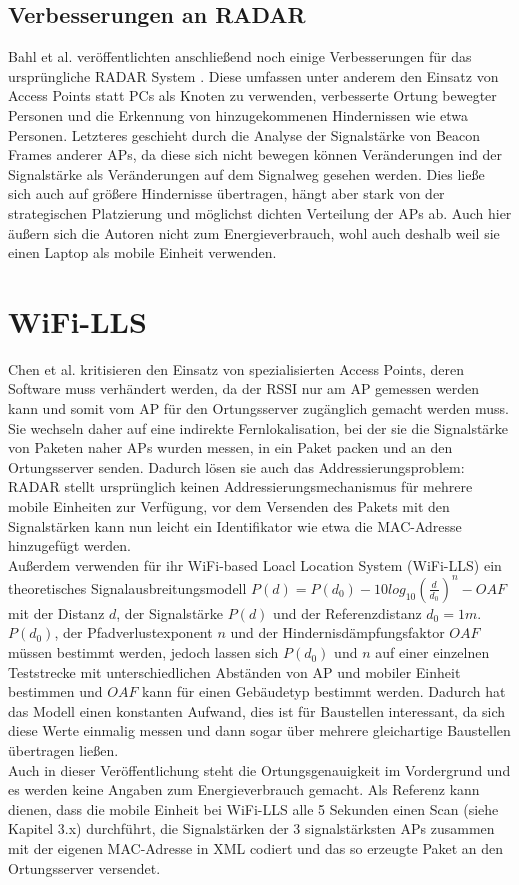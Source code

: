 \subsection{Verbesserungen an RADAR}
Bahl et al. veröffentlichten anschließend noch einige Verbesserungen für das ursprüngliche RADAR System \cite{bahl2000enhancements}.
Diese umfassen unter anderem den Einsatz von Access Points statt PCs als Knoten zu verwenden, verbesserte Ortung bewegter Personen und die Erkennung von hinzugekommenen Hindernissen wie etwa Personen.
Letzteres geschieht durch die Analyse der Signalstärke von Beacon Frames anderer APs, da diese sich nicht bewegen können Veränderungen ind der Signalstärke als Veränderungen auf dem Signalweg gesehen werden.
Dies ließe sich auch auf größere Hindernisse übertragen, hängt aber stark von der strategischen Platzierung und möglichst dichten Verteilung der APs ab.
Auch hier äußern sich die Autoren nicht zum Energieverbrauch, wohl auch deshalb weil sie einen Laptop als mobile Einheit verwenden.


\section{WiFi-LLS}
\label{ch:Vorherige:sec:LLS}
Chen et al. kritisieren den Einsatz von spezialisierten Access Points, deren Software muss verhändert werden, da der RSSI nur am AP gemessen werden kann und somit vom AP für den Ortungsserver zugänglich gemacht werden muss. 
Sie wechseln daher auf eine indirekte Fernlokalisation, bei der sie die Signalstärke von Paketen naher APs wurden messen, in ein Paket packen und an den Ortungsserver senden. 
Dadurch lösen sie auch das Addressierungsproblem: RADAR stellt ursprünglich keinen Addressierungsmechanismus für mehrere mobile Einheiten zur Verfügung, vor dem Versenden des Pakets mit den Signalstärken kann nun leicht ein Identifikator wie etwa die MAC-Adresse hinzugefügt werden.\\
Außerdem verwenden für ihr WiFi-based Loacl Location System (WiFi-LLS) ein theoretisches Signalausbreitungsmodell $P(d) = P(d_0) - 10log_{10}(\frac{d}{d_0})^n - OAF$ mit der Distanz $d$, der Signalstärke $P(d)$ und der Referenzdistanz $d_0 = 1m$. 
$P(d_0)$, der Pfadverlustexponent $n$ und der Hindernisdämpfungsfaktor $OAF$ müssen bestimmt werden, jedoch lassen sich $P(d_0)$ und $n$ auf einer einzelnen Teststrecke mit unterschiedlichen Abständen von AP und mobiler Einheit bestimmen und $OAF$ kann für einen Gebäudetyp bestimmt werden.
Dadurch hat das Modell einen konstanten Aufwand, dies ist für Baustellen interessant, da sich diese Werte einmalig messen und dann sogar über mehrere gleichartige Baustellen übertragen ließen.\\
Auch in dieser Veröffentlichung steht die Ortungsgenauigkeit im Vordergrund und es werden keine Angaben zum Energieverbrauch gemacht. 
Als Referenz kann dienen, dass die mobile Einheit bei WiFi-LLS alle 5 Sekunden einen Scan (siehe Kapitel 3.x) durchführt, die Signalstärken der 3 signalstärksten APs zusammen mit der eigenen MAC-Adresse in XML codiert und das so erzeugte Paket an den Ortungsserver versendet.

